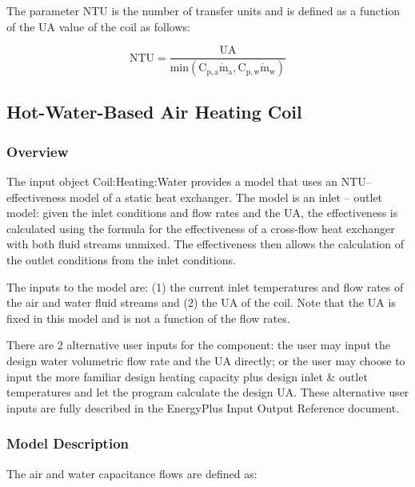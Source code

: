 The parameter NTU is the number of transfer units and is defined as a function of the UA value of the coil as follows:

\begin{equation}
{\mathrm{NTU}} = \frac{{{\mathrm{UA}}}}{{{\mathrm{min}}\left( {{{\mathrm{C}}_{{\mathrm{p,a}}}}{{{\mathrm{\dot m}}}_{\mathrm{a}}}{\mathrm{,}}{{\mathrm{C}}_{{\mathrm{p,w}}}}{{{\mathrm{\dot m}}}_{\mathrm{w}}}} \right)}}
\end{equation}

\subsection{Hot-Water-Based Air Heating Coil}\label{hot-water-based-air-heating-coil}

\subsubsection{Overview}\label{overview-010}

The input object Coil:Heating:Water provides a model that uses an NTU--effectiveness model of a static heat exchanger. The model is an inlet -- outlet model: given the inlet conditions and flow rates and the UA, the effectiveness is calculated using the formula for the effectiveness of a cross-flow heat exchanger with both fluid streams unmixed. The effectiveness then allows the calculation of the outlet conditions from the inlet conditions.

The inputs to the model are: (1) the current inlet temperatures and flow rates of the air and water fluid streams and (2) the UA of the coil. Note that the UA is fixed in this model and is not a function of the flow rates.

There are 2 alternative user inputs for the component: the user may input the design water volumetric flow rate and the UA directly; or the user may choose to input the more familiar design heating capacity plus design inlet \& outlet temperatures and let the program calculate the design UA. These alternative user inputs are fully described in the EnergyPlus Input Output Reference document.

\subsubsection{Model Description}\label{model-description-1-004}

The air and water capacitance flows are defined as:

